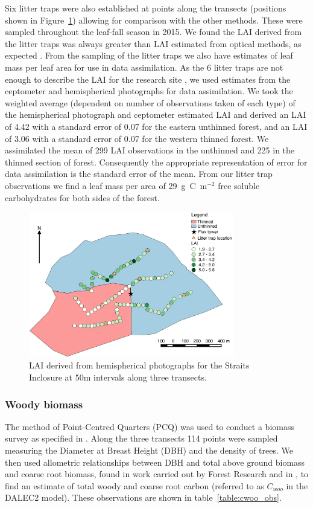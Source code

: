 \documentclass[draft,linenumbers]{agujournal}
\begin{document}
Six litter traps were also established at points along the transects (positions shown in Figure~\ref{fig:hemi_lai}) allowing for comparison with the other methods. These were sampled throughout the leaf-fall season in 2015. We found the LAI derived from the litter traps was always greater than LAI estimated from optical methods, as expected \citep{breda2003ground}. From the sampling of the litter traps we also have estimates of {\color{blue}leaf mass per leaf area} for use in data assimilation. As the 6 litter traps are not enough to describe the LAI for the research site \citep{kimmins1973some}, we used estimates from the ceptometer and hemispherical photographs for data assimilation. We took the weighted average (dependent on number of observations taken of each type) of the hemispherical photograph and ceptometer estimated LAI and derived an LAI of 4.42 with a standard error of 0.07 for the eastern unthinned forest, and an LAI of 3.06 with a standard error of 0.07 for the western thinned forest. We assimilated the mean of 299 LAI observations in the unthinned and 225 in the thinned section of forest. Consequently the appropriate representation of error for data assimilation is the standard error of the mean. From our litter trap observations we find a leaf mass per area of 29~g~C~m\(^{-2}\) free soluble carbohydrates for both sides of the forest.


\begin{figure}[ht]
    \centering
    \includegraphics[width=0.8\textwidth]{thinned.pdf}
    \caption{LAI derived from hemispherical photographs for the Straits Inclosure at 50m intervals along three transects.} \label{fig:hemi_lai}
\end{figure}

\subsubsection{Woody biomass}  
The method of Point-Centred Quarters (PCQ) was used to conduct a biomass survey as specified in \citet{dahdouh2006empirical}. Along the three transects 114 points were sampled measuring the Diameter at Breast Height (DBH) and the density of trees. We then used allometric relationships between DBH and total above ground biomass and coarse root biomass, found in work carried out by Forest Research and in \citet{mckay2003woodfuel}, to find an estimate of total woody and coarse root carbon (referred to as \(C_{woo}\) in the DALEC2 model). These observations are shown in table~\ref{table:cwoo_obs}.
\end{document}
